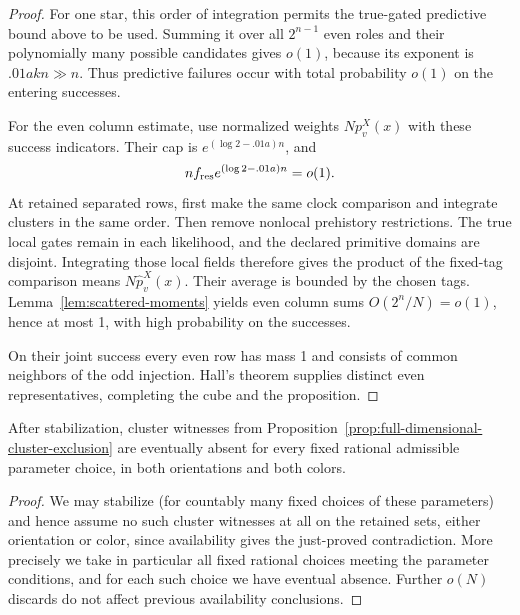 \begin{proof}
For one star, this order of integration permits the true-gated predictive bound above to be used. Summing it over all \(2^{n-1}\) even roles and their polynomially many possible candidates gives \(o(1)\), because its exponent is \(.01akn\gg n\). Thus predictive failures occur with total probability \(o(1)\) on the entering successes.

For the even column estimate, use normalized weights \(Np_v^X(x)\) with these success indicators. Their cap is \(e^{(\log2-.01a)n}\), and
\[
 nf_{\rm res}e^{(\log2-.01a)n}=o(1).
\]
At retained separated rows, first make the same clock comparison and integrate clusters in the same order. Then remove nonlocal prehistory restrictions. The true local gates remain in each likelihood, and the declared primitive domains are disjoint. Integrating those local fields therefore gives the product of the fixed-tag comparison means \(N\widehat p_v^X(x)\). Their average is bounded by the chosen tags. Lemma~\ref{lem:scattered-moments} yields even column sums \(O(2^n/N)=o(1)\), hence at most 1, with high probability on the successes.

On their joint success every even row has mass 1 and consists of common neighbors of the odd injection. Hall's theorem supplies distinct even representatives, completing the cube and the proposition.

\end{proof}

\begin{corollary}\label{cor:eventual-cluster-absence}
After stabilization, cluster witnesses from Proposition~\ref{prop:full-dimensional-cluster-exclusion} are eventually absent for every fixed rational admissible parameter choice, in both orientations and both colors.
\end{corollary}

\begin{proof}
We may stabilize (for countably many fixed choices of these parameters) and hence assume no such cluster witnesses at all on the retained sets, either orientation or color, since availability gives the just-proved contradiction. More precisely we take in particular all fixed rational choices meeting the parameter conditions, and for each such choice we have eventual absence. Further \(o(N)\) discards do not affect previous availability conclusions.
\end{proof}
